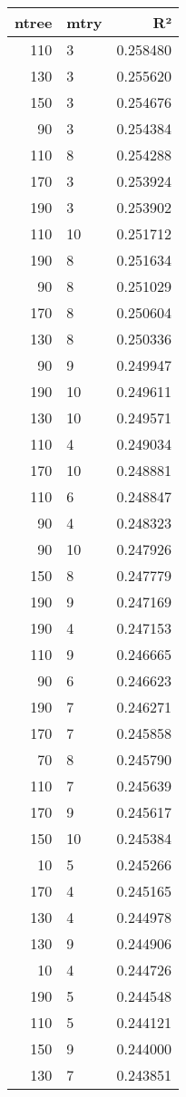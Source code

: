 \begin{tabular}{rlr}
\toprule
ntree & mtry & R² \\
\midrule
110 & 3 & 0.258480 \\
130 & 3 & 0.255620 \\
150 & 3 & 0.254676 \\
90 & 3 & 0.254384 \\
110 & 8 & 0.254288 \\
170 & 3 & 0.253924 \\
190 & 3 & 0.253902 \\
110 & 10 & 0.251712 \\
190 & 8 & 0.251634 \\
90 & 8 & 0.251029 \\
170 & 8 & 0.250604 \\
130 & 8 & 0.250336 \\
90 & 9 & 0.249947 \\
190 & 10 & 0.249611 \\
130 & 10 & 0.249571 \\
110 & 4 & 0.249034 \\
170 & 10 & 0.248881 \\
110 & 6 & 0.248847 \\
90 & 4 & 0.248323 \\
90 & 10 & 0.247926 \\
150 & 8 & 0.247779 \\
190 & 9 & 0.247169 \\
190 & 4 & 0.247153 \\
110 & 9 & 0.246665 \\
90 & 6 & 0.246623 \\
190 & 7 & 0.246271 \\
170 & 7 & 0.245858 \\
70 & 8 & 0.245790 \\
110 & 7 & 0.245639 \\
170 & 9 & 0.245617 \\
150 & 10 & 0.245384 \\
10 & 5 & 0.245266 \\
170 & 4 & 0.245165 \\
130 & 4 & 0.244978 \\
130 & 9 & 0.244906 \\
10 & 4 & 0.244726 \\
190 & 5 & 0.244548 \\
110 & 5 & 0.244121 \\
150 & 9 & 0.244000 \\
130 & 7 & 0.243851 \\

\end{tabular}
